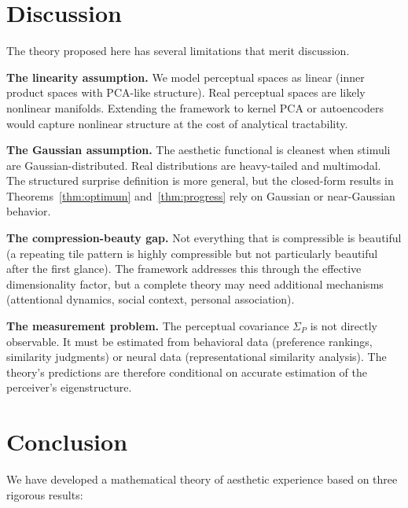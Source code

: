 \documentclass[journal]{IEEEtran}
\begin{document}
\section{Discussion}
\label{sec:discussion}

The theory proposed here has several limitations that merit discussion.

\textbf{The linearity assumption.}  We model perceptual spaces as
linear (inner product spaces with PCA-like structure).  Real perceptual
spaces are likely nonlinear manifolds.  Extending the framework to
kernel PCA or autoencoders would capture nonlinear structure at the
cost of analytical tractability.

\textbf{The Gaussian assumption.}  The aesthetic functional is cleanest
when stimuli are Gaussian-distributed.  Real distributions are
heavy-tailed and multimodal.  The structured surprise definition is
more general, but the closed-form results in Theorems~\ref{thm:optimum}
and~\ref{thm:progress} rely on Gaussian or near-Gaussian behavior.

\textbf{The compression-beauty gap.}  Not everything that is
compressible is beautiful (a repeating tile pattern is highly
compressible but not particularly beautiful after the first glance).
The framework addresses this through the effective dimensionality
factor, but a complete theory may need additional mechanisms
(attentional dynamics, social context, personal association).

\textbf{The measurement problem.}  The perceptual covariance
$\Sigma_P$ is not directly observable.  It must be estimated from
behavioral data (preference rankings, similarity judgments) or neural
data (representational similarity analysis).  The theory's predictions
are therefore conditional on accurate estimation of the perceiver's
eigenstructure.


\section{Conclusion}
\label{sec:conclusion}

We have developed a mathematical theory of aesthetic experience based
on three rigorous results:
\end{document}
